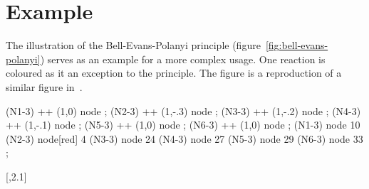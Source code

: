 \documentclass[load-preamble+]{cnltx-doc}
\begin{document}
\section{Example}

The illustration of the Bell-Evans-Polanyi principle
(figure~\ref{fig:bell-evans-polanyi}) serves as an example for a more complex
usage. One reaction is coloured as it an exception to the principle. The
figure is a reproduction of a similar figure in~\cite{brueckner}.

\begin{sourcecode}
  \setatomsep{1.5em}
  \DeclareChemIUPAC{}
  \begin{endiagram}[
     tikz         = {yscale=1.5}, scale        = 1.7,
     y-label      = above,        y-label-text = $\Delta H$,
     x-label      = right,        x-label-text = RK,
     energy-step  = 10]
    \draw[right] (N1-3) ++ (1,0)
      node {\small {} } ;
     (N2-3) ++ (1,-.3)
      node {\small {} } ;
    \draw[right] (N3-3) ++ (1,-.2)
      node {\small {} } ;
    \draw[right] (N4-3) ++ (1,-.1)
      node {\small {} } ;
    \draw[right] (N5-3) ++ (1,0)
      node {\small {} } ;
    \draw[right] (N6-3) ++ (1,0)
      node {\small {} } ;
    \draw[above,font=\fontfamily{fxlf}\selectfont\footnotesize]
     (N1-3) node {10} (N2-3) node[red] {4}
     (N3-3) node {24} (N4-3) node {27}
     (N5-3) node {29} (N6-3) node {33} ;
  \end{endiagram}

  \setatomsep{2em}
  \schemestart
    \arrow{->[$\Delta$]}[,2.1]
  \schemestop
\end{sourcecode}
\end{document}
